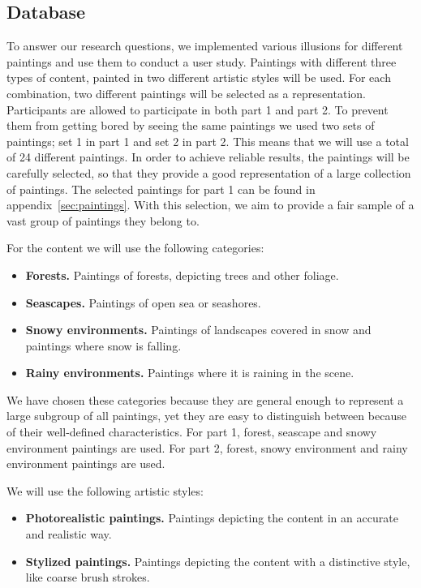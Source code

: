 \documentclass[a4paper]{article}
\begin{document}
\subsection{Database}
To answer our research questions, we implemented various illusions for different paintings and use them to conduct a user study. Paintings with different three types of content, painted in two different artistic styles will be used. For each combination, two different paintings will be selected as a representation. Participants are allowed to participate in both part 1 and part 2. To prevent them from getting bored by seeing the same paintings we used two sets of paintings; set 1 in part 1 and set 2 in part 2. This means that we will use a total of 24 different paintings. In order to achieve reliable results, the paintings will be carefully selected, so that they provide a good representation of a large collection of paintings. The selected paintings for part 1 can be found in appendix~\ref{sec:paintings}. With this selection, we aim to provide a fair sample of a vast group of paintings they belong to.

For the content we will use the following categories:

\begin{itemize}
\item \textbf{Forests.} Paintings of forests, depicting trees and other foliage.
\item \textbf{Seascapes.} Paintings of open sea or seashores.
\item \textbf{Snowy environments.} Paintings of landscapes covered in snow and paintings where snow is falling.
\item \textbf{Rainy environments.} Paintings where it is raining in the scene.
\end{itemize}
We have chosen these categories because they are general enough to represent a large subgroup of all paintings, yet they are easy to distinguish between because of their well-defined characteristics. For part 1, forest, seascape and snowy environment paintings are used. For part 2, forest, snowy environment and rainy environment paintings are used.

We will use the following artistic styles:

\begin{itemize}
\item \textbf{Photorealistic paintings.} Paintings depicting the content in an accurate and realistic way.
\item \textbf{Stylized paintings.} Paintings depicting the content with a distinctive style, like coarse brush strokes.
\end{itemize}
\end{document}
